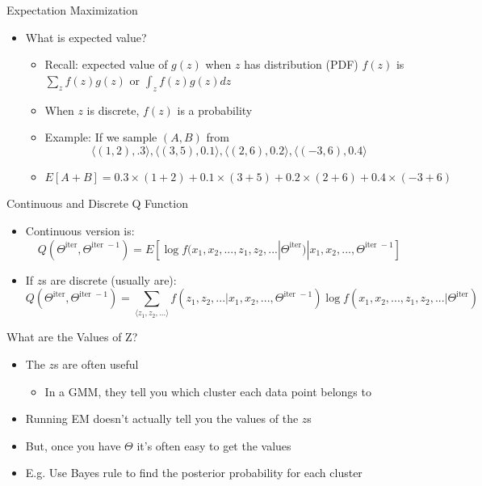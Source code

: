 \documentclass[aspectratio=169]{beamer}
\begin{document}
\begin{frame}{Expectation Maximization}

\begin{itemize}
\item What is expected value?
	\begin{itemize}
	\item Recall: expected value of $g(z)$ when $z$ has distribution (PDF) $f(z)$ is $\sum_z f(z) g(z)$ or $\int_z f(z) g(z) dz$
	\item When $z$ is discrete, $f(z)$ is a probability
	\item Example: If we sample $(A, B)$ from $$\langle (1, 2), .3 \rangle, 
		\langle (3, 5), 0.1 \rangle, 
		\langle (2, 6), 0.2 \rangle, 
		\langle (-3, 6), 0.4 \rangle$$
	\item $E[A + B] = 0.3 \times (1 + 2) + 0.1 \times (3 + 5) + 0.2 \times (2 + 6) + 0.4 \times (-3 + 6)$
	\end{itemize}
\end{itemize}
\end{frame}
\begin{frame}{Continuous and Discrete Q Function}

\begin{itemize}
	\item Continuous version is:
        $$Q(\Theta^{\textrm{iter}}, \Theta^{\textrm{iter }-1}) = E \left[ \log f (x_1, x_2, ..., z_1, z_2, ... | \Theta^{\textrm{iter}}) |
                        x_1,  x_2, ..., \Theta^{\textrm{iter }-1} \right]$$
	\item If $z$s are discrete (usually are):
		$$Q(\Theta^{\textrm{iter}}, \Theta^{\textrm{iter }-1}) =
			\sum_{\langle z_1, z_2, ... \rangle} f (z_1, z_2, ... | x_1,  x_2, ..., \Theta^{\textrm{iter }-1}) 
				\log f (x_1, x_2, ..., z_1, z_2, ... | \Theta^{\textrm{iter}})$$
\end{itemize}
\end{frame}
\begin{frame}{What are the Values of Z?}

\begin{itemize}
\item The $z$s are often useful
\begin{itemize}
\item In a GMM, they tell you which cluster each data point belongs to
\end{itemize}
\item Running EM doesn't actually tell you the values of the $z$s
\item But, once you have $\Theta$ it's often easy to get the values
\item E.g. Use Bayes rule to find the posterior probability for each cluster
\end{itemize}
\end{frame}
\end{document}
